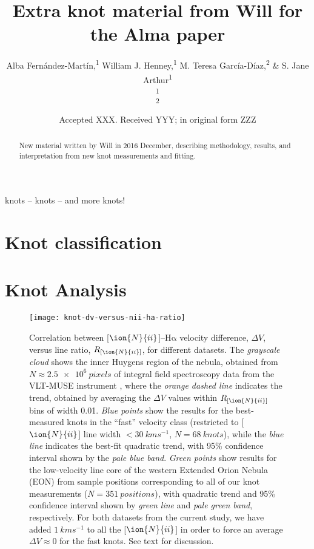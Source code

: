 \documentclass[usenatbib]{mnras}
\title[Will's extra material]{Extra knot material from Will for the
  Alma paper}
\author[Fernández-Martín et al.]{
  Alba Fernández-Martín,\textsuperscript{1}
  William J. Henney,\textsuperscript{1}
  M. Teresa García-Díaz,\textsuperscript{2}
  \& S. Jane Arthur\textsuperscript{1}\\
  \textsuperscript{1}\AddressIRyA\\
  \textsuperscript{2}\AddressEnsenada\\
}
\date{Accepted XXX. Received YYY; in original form ZZZ}
\begin{document}
\label{firstpage}
\pagerange{\pageref{firstpage}--\pageref{lastpage}}
\maketitle

\begin{abstract}
New material written by Will in 2016 December, describing methodology,
results, and interpretation from new knot measurements and fitting.
\end{abstract}

\begin{keywords}
knots -- knots -- and more knots!
\end{keywords}

\newcommand\nii{\ensuremath{\ion{N}{ii}}}
\newcommand\ha{\ensuremath{\mathrm{H\alpha}}}

\section{Knot classification}
\label{sec:knot-classification}

\section{Knot Analysis}
\label{sec:knot-analysis}

\begin{figure}
  \centering
  \texttt{[image: knot-dv-versus-nii-ha-ratio]}
  \caption{Correlation between [\nii]--\ha{} velocity difference,
    \(\Delta V\), versus line ratio, \(R_{[\nii]}\), for different
    datasets. The \textit{grayscale cloud} shows the inner Huygens
    region of the nebula, obtained from
    \(N \approx \SI{2.5e6}{pixels}\) of integral field spectroscopy
    data from the VLT-MUSE instrument \citep{MUSE}, where the
    \textit{orange dashed line} indicates the trend, obtained by
    averaging the \(\Delta V\) values within \(R_{[\nii]}\) bins of
    width 0.01.  \textit{Blue points} show the results for the
    best-measured knots in the ``fast'' velocity class (restricted to
    [\nii] line width \(< \SI{30}{km s^{-1}}\),
    \(N = \SI{68}{knots}\)), while the \textit{blue line} indicates
    the best-fit quadratic trend, with 95\% confidence interval shown
    by the \textit{pale blue band}.  \textit{Green points} show
    results for the low-velocity line core of the western Extended
    Orion Nebula (EON) from sample positions corresponding to all of
    our knot measurements (\(N = \SI{351}{positions}\)), with
    quadratic trend and 95\% confidence interval shown by
    \textit{green line} and \textit{pale green band}, respectively.
    For both datasets from the current study, we have added
    \(\SI{+1}{km s^{-1}}\) to all the [\nii] in order to force an
    average \(\Delta V \approx 0\) for the fast knots.  See text for
    discussion.}
\end{figure}




\label{lastpage}
\end{document}
